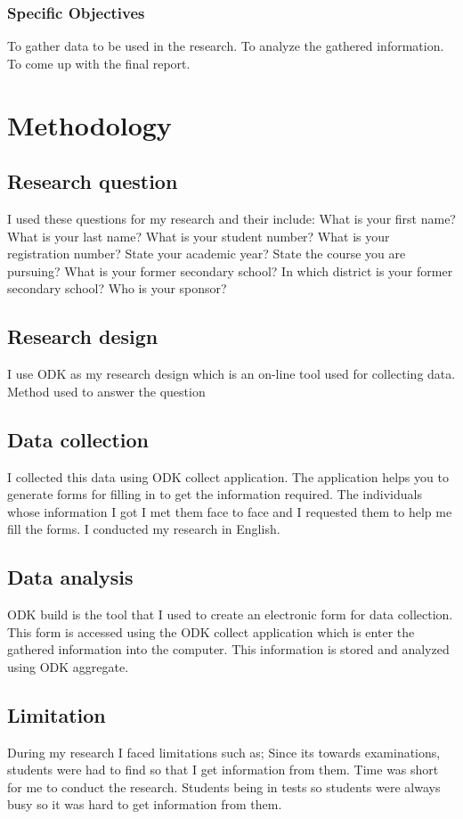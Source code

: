 \documentclass[12]{article}
\begin{document}
\subsubsection{Specific Objectives}
To gather data to be used in the research.
To analyze the gathered information.
To come up with the final report.

\section{Methodology}
\subsection{Research question}
I used these questions for my research and their include:
What is your first name?
What is your last name?
What is your student number?
What is your registration number?
State  your academic year?
State the course you are pursuing?
What is your former secondary school?
In which district is your former secondary school?
Who is your sponsor?
\subsection{Research design}
I use ODK as my research design which is an on-line tool used for collecting data.  
Method used to answer the question
\subsection{Data collection}
I collected this data using ODK collect application. The application helps you to generate forms for filling in to get the information required. The individuals whose information I got I met them face to face and I requested them to help me fill the forms. I conducted my research in English. 
\subsection{Data analysis}
ODK build is the tool that I used to create an electronic form for data collection. This form is accessed using the ODK collect application which is enter the gathered information into the computer. This information is stored and analyzed using ODK aggregate.

\subsection{Limitation}
During my research I faced limitations such as;
Since its towards examinations, students were had to find so that I get information from them.
Time was short for me to conduct the research.
Students being in tests so students were always busy so it was hard to get information from them.
\end{document}
